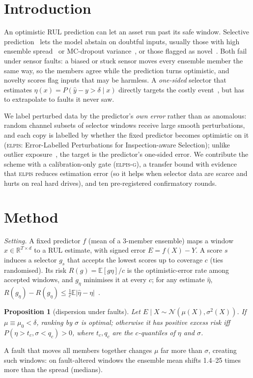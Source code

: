 \documentclass{esannV2}
\newtheorem{proposition}{Proposition}
\newcommand{\RPT}{\textsc{elpis}}
\newcommand{\AUTOD}{\textsc{elpis-g}}
\begin{document}
\section{Introduction}
An optimistic RUL prediction can let an asset run past its safe window. Selective prediction~\cite{chow1970optimum} lets the model abstain on doubtful inputs, usually those with high ensemble spread~\cite{lakshminarayanan2017simple} or MC-dropout variance~\cite{gal2016dropout}, or those flagged as novel~\cite{lee2018simple}. Both fail under sensor faults: a biased or stuck sensor moves every ensemble member the same way, so the members agree while the prediction turns optimistic, and novelty scores flag inputs that may be harmless. A \emph{one-sided} selector that estimates $\eta(x)=P(\hat y-y>\delta\mid x)$ directly targets the costly event~\cite{corbiere2019addressing,kamath2020selective}, but has to extrapolate to faults it never saw.

We label perturbed data by the predictor's \emph{own error} rather than as anomalous: random channel subsets of selector windows receive large smooth perturbations, and each copy is labelled by whether the fixed predictor becomes optimistic on it (\RPT: Error-Labelled Perturbations for Inspection-aware Selection); unlike outlier exposure~\cite{hendrycks2019deep}, the target is the predictor's one-sided error. We contribute the scheme with a calibration-only gate (\AUTOD), a transfer bound with evidence that \RPT{} reduces estimation error (so it helps when selector data are scarce and hurts on real hard drives), and ten pre-registered confirmatory rounds.

\section{Method}
\emph{Setting.} A fixed predictor $f$ (mean of a 3-member ensemble) maps a window $x\in\mathbb R^{T\times d}$ to a RUL estimate, with signed error $E=f(X)-Y$. A score $s$ induces a selector $g_s$ that accepts the lowest scores up to coverage $c$ (ties randomised). Its risk $R(g)=\mathbb E[g\eta]/c$ is the optimistic-error rate among accepted windows, and $g_\eta$ minimises it at every $c$; for any estimate $\hat\eta$, $R(g_{\hat\eta})-R(g_\eta)\le\frac1c\mathbb E|\hat\eta-\eta|$~\cite{chow1970optimum}.

\begin{proposition}[dispersion under faults]\label{prop:gauss}
Let $E\mid X\sim\mathcal N(\mu(X),\sigma^2(X))$. If $\mu\equiv\mu_0<\delta$, ranking by $\sigma$ is optimal; otherwise it has positive excess risk iff $P(\eta>t_c,\sigma<q_c)>0$, where $t_c,q_c$ are the $c$-quantiles of $\eta$ and $\sigma$.
\end{proposition}
\noindent A fault that moves all members together changes $\mu$ far more than $\sigma$, creating such windows: on fault-altered windows the ensemble mean shifts 1.4--25 times more than the spread (medians).
\end{document}
